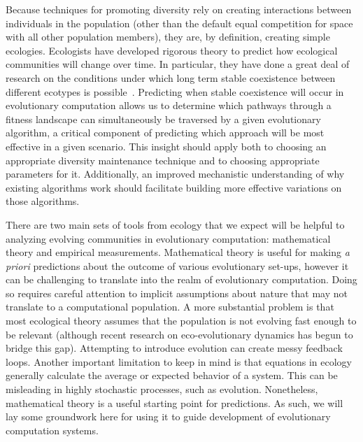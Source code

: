 Because techniques for promoting diversity rely on creating interactions  between individuals in the population (other than the default equal competition for space with all other population members), they are, by definition, creating simple ecologies. Ecologists have developed rigorous theory to predict how ecological communities will change over time. In particular, they have done a great deal of research on the conditions under which long term stable coexistence between different ecotypes is possible~\cite{pacala_limiting_1994, chesson_mechanisms_2000,chase_ecological_2003,letten_linking_2017}. Predicting when stable coexistence will occur in evolutionary computation allows us to determine which pathways through a fitness landscape can simultaneously be traversed by a given evolutionary algorithm, a critical component of predicting which approach will be most effective in a given scenario. This insight should apply both to choosing an appropriate diversity maintenance technique and to choosing appropriate parameters for it. Additionally, an improved mechanistic understanding of why existing algorithms work should facilitate building more effective variations on those algorithms.

There are two main sets of tools from ecology that we expect will be helpful to analyzing evolving communities in evolutionary computation: mathematical theory and empirical measurements. Mathematical theory is useful for making \textit{a priori} predictions about the outcome of various evolutionary set-ups, however it can be challenging to translate into the realm of evolutionary computation. Doing so requires careful attention to implicit assumptions about nature that may not translate to a computational population. A more substantial problem is that most ecological theory assumes that the population is not evolving fast enough to be relevant (although recent research on eco-evolutionary dynamics has begun to bridge this gap). Attempting to introduce evolution can create messy feedback loops. Another important limitation to keep in mind is that equations in ecology generally calculate the average or expected behavior of a system. This can be misleading in highly stochastic processes, such as evolution. Nonetheless, mathematical theory is a useful starting point for predictions. As such, we will lay some groundwork here for using it to guide development of evolutionary computation systems.

